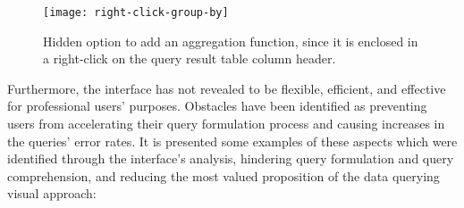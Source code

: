 \begin{figure}[htbp]
	\centering
	\texttt{[image: right-click-group-by]}
	\caption{Hidden option to add an aggregation function, since it is enclosed in a right-click on the query result table column header.}
	\label{fig:rightClickGroupBy}
\end{figure}

Furthermore, the interface has not revealed to be flexible, efficient, and effective for professional users' purposes. Obstacles have been identified as preventing users from accelerating their query formulation process and causing increases in the queries' error rates. It is presented some examples of these aspects which were identified through the interface's analysis, hindering query formulation and query comprehension, and reducing the most valued proposition of the data querying visual approach:

